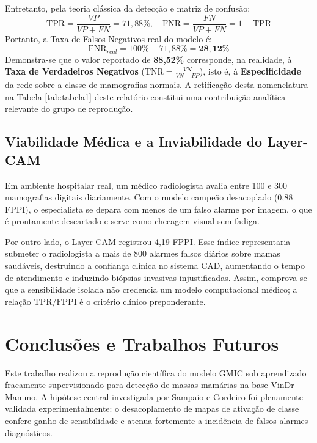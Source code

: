 \documentclass[12pt]{article}
\begin{document}
Entretanto, pela teoria clássica da detecção e matriz de confusão:
\begin{equation}
\text{TPR} = \frac{VP}{VP + FN} = 71,88\%, \quad \text{FNR} = \frac{FN}{VP + FN} = 1 - \text{TPR}
\end{equation}
Portanto, a Taxa de Falsos Negativos real do modelo é:
\begin{equation}
\text{FNR}_{real} = 100\% - 71,88\% = \mathbf{28,12\%}
\end{equation}
Demonstra-se que o valor reportado de \textbf{88,52\%} corresponde, na realidade, à \textbf{Taxa de Verdadeiros Negativos} ($\text{TNR} = \frac{VN}{VN + FP}$), isto é, à \textbf{Especificidade} da rede sobre a classe de mamografias normais. A retificação desta nomenclatura na Tabela \ref{tab:tabela1} deste relatório constitui uma contribuição analítica relevante do grupo de reprodução.

\subsection{Viabilidade Médica e a Inviabilidade do Layer-CAM}

Em ambiente hospitalar real, um médico radiologista avalia entre 100 e 300 mamografias digitais diariamente. Com o modelo campeão desacoplado (0,88 FPPI), o especialista se depara com menos de um falso alarme por imagem, o que é prontamente descartado e serve como checagem visual sem fadiga.

Por outro lado, o Layer-CAM registrou 4,19 FPPI. Esse índice representaria submeter o radiologista a mais de 800 alarmes falsos diários sobre mamas saudáveis, destruindo a confiança clínica no sistema CAD, aumentando o tempo de atendimento e induzindo biópsias invasivas injustificadas. Assim, comprova-se que a sensibilidade isolada não credencia um modelo computacional médico; a relação $\text{TPR} / \text{FPPI}$ é o critério clínico preponderante.

\section{Conclusões e Trabalhos Futuros}

Este trabalho realizou a reprodução científica do modelo GMIC sob aprendizado fracamente supervisionado para detecção de massas mamárias na base VinDr-Mammo. A hipótese central investigada por Sampaio e Cordeiro foi plenamente validada experimentalmente: o desacoplamento de mapas de ativação de classe confere ganho de sensibilidade e atenua fortemente a incidência de falsos alarmes diagnósticos.
\end{document}
